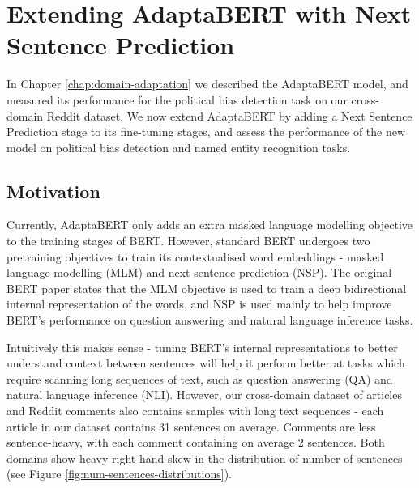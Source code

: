 \chapter{Extending AdaptaBERT with Next Sentence Prediction} \label{chap:extending-adaptabert}

In Chapter \ref{chap:domain-adaptation} we described the AdaptaBERT model, and measured its performance for the political bias detection task on our cross-domain Reddit dataset. We now extend AdaptaBERT by adding a Next Sentence Prediction stage to its fine-tuning stages, and assess the performance of the new model on political bias detection and named entity recognition tasks.

\section{Motivation}

Currently, AdaptaBERT only adds an extra masked language modelling objective to the training stages of BERT. However, standard BERT undergoes two pretraining objectives to train its contextualised word embeddings - masked language modelling (MLM) and next sentence prediction (NSP). The original BERT paper \cite{bert} states that the MLM objective is used to train a deep bidirectional internal representation of the words, and NSP is used mainly to help improve BERT's performance on question answering and natural language inference tasks.

Intuitively this makes sense - tuning BERT's internal representations to better understand context between sentences will help it perform better at tasks which require scanning long sequences of text, such as question answering (QA) and natural language inference (NLI). However, our cross-domain dataset of articles and Reddit comments also contains samples with long text sequences - each article in our dataset contains 31 sentences on average. Comments are less sentence-heavy, with each comment containing on average 2 sentences. Both domains show heavy right-hand skew in the distribution of number of sentences (see Figure \ref{fig:num-sentences-distributions}).


